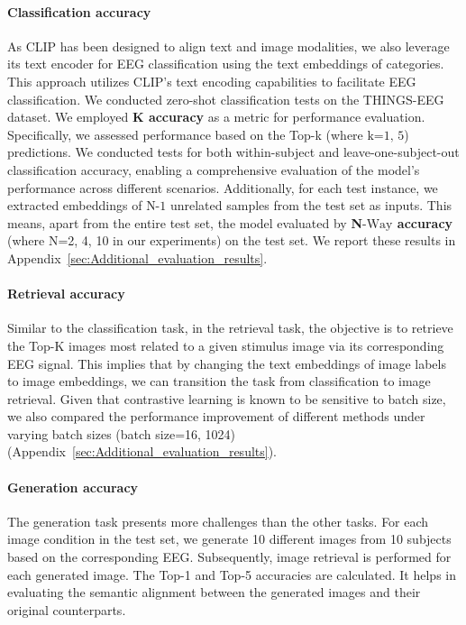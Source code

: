 \documentclass{article}
\begin{document}
\paragraph{Classification accuracy}
As CLIP has been designed to align text and image modalities, we also leverage its text encoder for EEG classification using the text embeddings of categories. This approach utilizes CLIP's text encoding capabilities to facilitate EEG classification.
We conducted zero-shot classification tests on the THINGS-EEG dataset. 
We employed \textbf{K accuracy} as a metric for performance evaluation. Specifically, we assessed performance based on the Top-k (where $\text{k=1, 5}$) predictions. We conducted tests for both within-subject and leave-one-subject-out classification accuracy, enabling a comprehensive evaluation of the model's performance across different scenarios.
Additionally, for each test instance, we extracted embeddings of $\text{N-1}$ unrelated samples from the test set as inputs. This means, apart from the entire test set, the model evaluated by \textbf{N$\text{-Way}$ accuracy} (where N=2, 4, 10 in our experiments) on the test set. We report these results in Appendix~\ref{sec:Additional_evaluation_results}.

\paragraph{Retrieval accuracy}

Similar to the classification task, in the retrieval task, the objective is to retrieve the Top-K images most related to a given stimulus image via its corresponding EEG signal. This implies that by changing the text embeddings of image labels to image embeddings, we can transition the task from classification to image retrieval. Given that contrastive learning is known to be sensitive to batch size, we also compared the performance improvement of different methods under varying batch sizes (batch size=16, 1024) (Appendix~\ref{sec:Additional_evaluation_results}).



\paragraph{Generation accuracy}

The generation task presents more challenges than the other tasks. For each image condition in the test set, we generate 10 different images from 10 subjects based on the corresponding EEG. Subsequently, image retrieval is performed for each generated image. The Top-1 and Top-5 accuracies are calculated. It helps in evaluating the semantic alignment between the generated images and their original counterparts.
\end{document}
